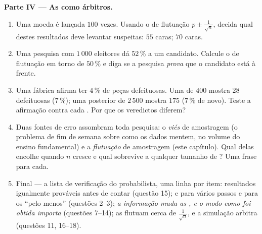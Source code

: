 \begin{problem}
\medskip
\noindent\textbf{Parte IV --- As  como árbitros.}
\begin{enumerate}[resume]
  \item Uma moeda é lançada $100$ vezes. Usando o  de
        flutuação $p \pm \frac{1}{\sqrt n}$, decida qual destes
        resultados deve levantar suspeitas: $55$ caras; $70$
        caras.
  \item Uma pesquisa com $1\,000$ eleitores dá $52\,\%$ a um
        candidato. Calcule o  de flutuação em torno de
        $50\,\%$ e diga se a pesquisa \emph{prova} que o
        candidato está à frente.
  \item Uma fábrica afirma ter $4\,\%$ de peças defeituosas. Uma
         de $400$ mostra $28$ defeituosas ($7\,\%$); uma
         posterior de $2\,500$ mostra $175$ ($7\,\%$ de
        novo). Teste a afirmação contra cada . Por que os
        veredictos diferem?
  \item Duas fontes de erro assombram toda pesquisa: o
        \emph{viés} de amostragem (o problema de fim de semana
        sobre como os dados mentem, no volume do ensino
        fundamental) e a \emph{flutuação} de amostragem (este
        capítulo). Qual delas encolhe quando $n$ cresce e qual
        sobrevive a qualquer tamanho de ? Uma frase para
        cada.
  \item Final --- a lista de verificação do probabilista, uma
        linha por item: resultados igualmente prováveis antes de
        contar (questão 15);  e  para vários
        passos e para os ``pelo menos'' (questões 2--3); \emph{a
        informação muda as , e o modo como foi
        obtida importa} (questões 7--14); as  flutuam
        cerca de $\frac{1}{\sqrt n}$, e a simulação arbitra
        (questões 11, 16--18).
\end{enumerate}
\end{problem}

